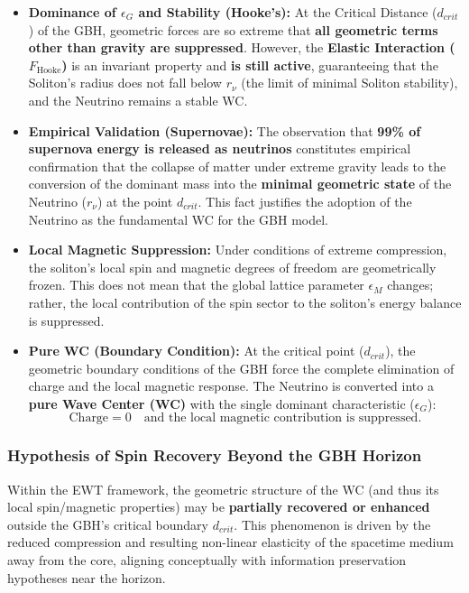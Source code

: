 \documentclass[10pt,a4paper]{article}
\begin{document}
\begin{itemize}
	\item \textbf{Dominance of \(\epsilon_{G}\) and Stability (Hooke's):} At the Critical Distance (\(d_{crit}\)) of the GBH, geometric forces are so extreme that \textbf{all geometric terms other than gravity are suppressed}. However, the \textbf{Elastic Interaction (\(F_{\text{Hooke}}\))} is an invariant property and \textbf{is still active}, guaranteeing that the Soliton's radius does not fall below \(r_{\nu}\) (the limit of minimal Soliton stability), and the Neutrino remains a stable WC.
	
	\item \textbf{Empirical Validation (Supernovae):} The observation that \textbf{99\% of supernova energy is released as neutrinos} constitutes empirical confirmation that the collapse of matter under extreme gravity leads to the conversion of the dominant mass into the \textbf{minimal geometric state} of the Neutrino (\(r_{\nu}\)) at the point \(d_{crit}\). This fact justifies the adoption of the Neutrino as the fundamental WC for the GBH model.
	
	\item \textbf{Local Magnetic Suppression:} Under conditions of extreme compression, the soliton's local spin and magnetic degrees of freedom are geometrically frozen. This does not mean that the global lattice parameter \(\epsilon_M\) changes; rather, the local contribution of the spin sector to the soliton's energy balance is suppressed.
	
	\item \textbf{Pure WC (Boundary Condition):} At the critical point (\(d_{crit}\)), the geometric boundary conditions of the GBH force the complete elimination of charge and the local magnetic response. The Neutrino is converted into a \textbf{pure Wave Center (WC)} with the single dominant characteristic (\(\epsilon_{G}\)):
	\begin{equation}
		\text{Charge} = 0 \quad \text{and the local magnetic contribution is suppressed}.
	\end{equation}
\end{itemize}

\subsubsection*{Hypothesis of Spin Recovery Beyond the GBH Horizon}
Within the EWT framework, the geometric structure of the WC (and thus its local spin/magnetic properties) may be \textbf{partially recovered or enhanced} outside the GBH's critical boundary \(d_{crit}\). This phenomenon is driven by the reduced compression and resulting non-linear elasticity of the spacetime medium away from the core, aligning conceptually with information preservation hypotheses near the horizon.
\end{document}
